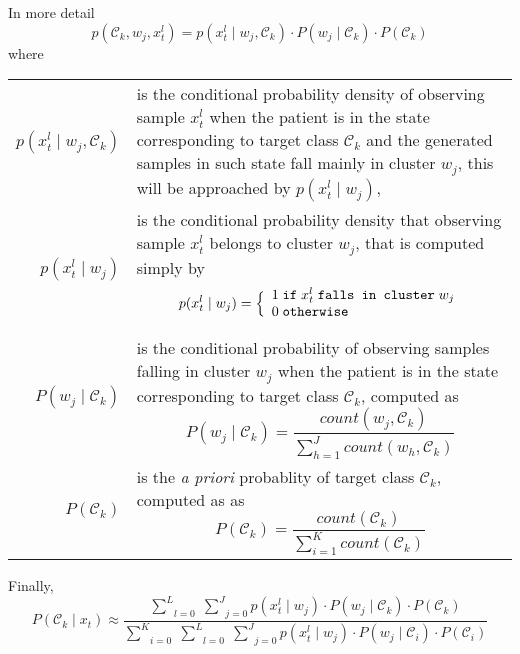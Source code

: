 \documentclass[a4paper,12pt]{article}
\begin{document}
\newpage

In more detail
\[
p(\mathcal{C}_{k}, w_{j}, x_{t}^{l}) =
p(x_{t}^{l} \mid w_{j}, \mathcal{C}_{k}) \cdot P(w_{j} \mid \mathcal{C}_{k}) \cdot P(\mathcal{C}_{k})
\]
where
\begin{center}
\begin{tabular}{rp{110mm}}
$p(x_{t}^{l} \mid w_{j}, \mathcal{C}_{k})$ & is the conditional probability density of observing sample
                                             $x_{t}^{l}$ when the patient is in the state corresponding
                                             to target class $\mathcal{C}_{k}$ and the generated samples
                                             in such state fall mainly in cluster $w_j$,
                                             this will be approached by $p(x_{t}^{l} \mid w_{j})$, \\
$p(x_{t}^{l} \mid w_{j})$ & is the conditional probability density that observing sample $x_{t}^{l}$
                            belongs to cluster $w_{j}$, that is computed simply by
                            $$p(x_{t}^{l} \mid w_{j}) = \Bigl\{ \begin{array}{l} 1 \; \texttt{if} \; x_{t}^{l} \; \texttt{falls in cluster} \; w_{j} \\ 0 \; \texttt{otherwise} \\ \end{array}$$ \\

$P(w_{j} \mid \mathcal{C}_{k})$ & is the conditional probability of observing samples falling in cluster $w_{j}$ when
                                  the patient is in the state corresponding to target class $\mathcal{C}_{k}$, computed
                                  as $$P(w_{j} \mid \mathcal{C}_{k}) = \frac{count(w_{j}, \mathcal{C}_{k})}{\sum_{h=1}^{J} count(w_{h}, \mathcal{C}_{k})}$$ \\

$P(\mathcal{C}_{k})$ & is the \emph{a priori} probablity of target class $\mathcal{C}_{k}$, computed as 
                                  as $$P(\mathcal{C}_{k}) = \frac{count(\mathcal{C}_{k})}{\sum_{i=1}^{K} count(\mathcal{C}_{k})}$$ \\
\end{tabular}
\end{center}

Finally,
\[
P(\mathcal{C}_{k} \mid x_{t}) \approx
    \frac{\underset{l=0}{\overset{L}{\sum}} \; \underset{j=0}{\overset{J}{\sum}}
        p(x_{t}^{l} \mid w_{j}) \cdot P(w_{j} \mid \mathcal{C}_{k}) \cdot P(\mathcal{C}_{k})}%
        {\underset{i=0}{\overset{K}{\sum}} \; \underset{l=0}{\overset{L}{\sum}} \; \underset{j=0}{\overset{J}{\sum}}
            p(x_{t}^{l} \mid w_{j}) \cdot P(w_{j} \mid \mathcal{C}_{i}) \cdot P(\mathcal{C}_{i})}
\]
\end{document}
